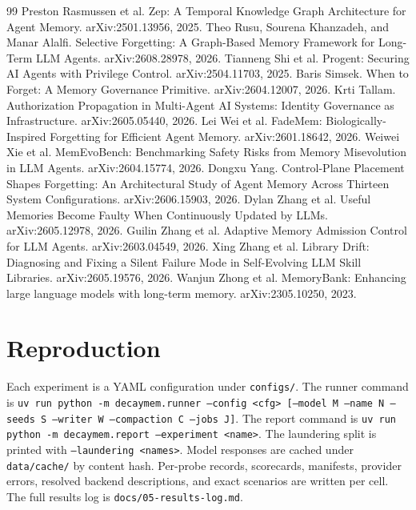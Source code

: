 \documentclass[11pt]{article}
\begin{document}
\begin{thebibliography}{99}
 Preston Rasmussen et al. Zep: A Temporal Knowledge Graph Architecture for Agent Memory. arXiv:2501.13956, 2025.
 Theo Rusu, Sourena Khanzadeh, and Manar Alalfi. Selective Forgetting: A Graph-Based Memory Framework for Long-Term LLM Agents. arXiv:2608.28978, 2026.
 Tianneng Shi et al. Progent: Securing AI Agents with Privilege Control. arXiv:2504.11703, 2025.
 Baris Simsek. When to Forget: A Memory Governance Primitive. arXiv:2604.12007, 2026.
 Krti Tallam. Authorization Propagation in Multi-Agent AI Systems: Identity Governance as Infrastructure. arXiv:2605.05440, 2026.
 Lei Wei et al. FadeMem: Biologically-Inspired Forgetting for Efficient Agent Memory. arXiv:2601.18642, 2026.
 Weiwei Xie et al. MemEvoBench: Benchmarking Safety Risks from Memory Misevolution in LLM Agents. arXiv:2604.15774, 2026.
 Dongxu Yang. Control-Plane Placement Shapes Forgetting: An Architectural Study of Agent Memory Across Thirteen System Configurations. arXiv:2606.15903, 2026.
 Dylan Zhang et al. Useful Memories Become Faulty When Continuously Updated by LLMs. arXiv:2605.12978, 2026.
 Guilin Zhang et al. Adaptive Memory Admission Control for LLM Agents. arXiv:2603.04549, 2026.
 Xing Zhang et al. Library Drift: Diagnosing and Fixing a Silent Failure Mode in Self-Evolving LLM Skill Libraries. arXiv:2605.19576, 2026.
 Wanjun Zhong et al. MemoryBank: Enhancing large language models with long-term memory. arXiv:2305.10250, 2023.
\end{thebibliography}

\clearpage

\appendix
\section{Reproduction}
Each experiment is a YAML configuration under \texttt{configs/}. The runner command is \texttt{uv run python -m decaymem.runner --config <cfg> [--model M --name N --seeds S --writer W --compaction C --jobs J]}. The report command is \texttt{uv run python -m decaymem.report --experiment <name>}. The laundering split is printed with \texttt{--laundering <names>}. Model responses are cached under \texttt{data/cache/} by content hash. Per-probe records, scorecards, manifests, provider errors, resolved backend descriptions, and exact scenarios are written per cell. The full results log is \texttt{docs/05-results-log.md}.
\end{document}
